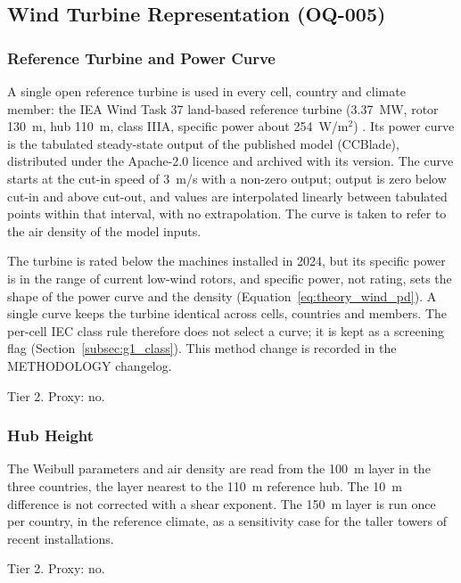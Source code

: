 \subsection{Wind Turbine Representation (OQ-005)}
\label{subsec:g1_turbine}

\subsubsection{Reference Turbine and Power Curve}

A single open reference turbine is used in every cell, country and
climate member: the IEA Wind Task 37 land-based reference turbine
(3.37~MW, rotor 130~m, hub 110~m, class IIIA, specific power about
254~W/m$^2$) \cite{bortolotti2019}. Its power curve is the tabulated
steady-state output of the published model (CCBlade), distributed under
the Apache-2.0 licence and archived with its version. The curve starts at
the cut-in speed of 3~m/s with a non-zero output; output is zero below
cut-in and above cut-out, and values are interpolated linearly between
tabulated points within that interval, with no extrapolation. The curve
is taken to refer to the air density of the model inputs.

The turbine is rated below the machines installed in 2024, but its
specific power is in the range of current low-wind rotors, and specific
power, not rating, sets the shape of the power curve and the density
(Equation~\ref{eq:theory_wind_pd}). A single curve keeps the turbine
identical across cells, countries and members. The per-cell IEC class
rule therefore does not select a curve; it is kept as a screening flag
(Section~\ref{subsec:g1_class}). This method change is recorded in the
METHODOLOGY changelog.

Tier 2. Proxy: no.

\subsubsection{Hub Height}

The Weibull parameters and air density are read from the 100~m layer in
the three countries, the layer nearest to the 110~m reference hub. The
10~m difference is not corrected with a shear exponent. The 150~m layer
is run once per country, in the reference climate, as a sensitivity case
for the taller towers of recent installations.

Tier 2. Proxy: no.

